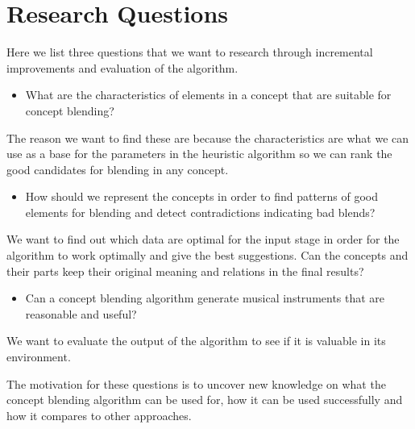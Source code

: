 
\section{Research Questions}
Here we list three questions that we want to research through incremental improvements and evaluation of the algorithm.
\begin{itemize}
\item What are the characteristics of elements in a concept that are suitable for concept blending?
\end{itemize}
The reason we want to find these are because the characteristics are what we can use as a base for the parameters in the heuristic algorithm so we can rank the good candidates for blending in any concept.
\begin{itemize}
\item How should we represent the concepts in order to find patterns of good elements for blending and detect contradictions indicating bad blends?
\end{itemize}
We want to find out which data are optimal for the input stage in order for the algorithm to work optimally and give the best suggestions. Can the concepts and their parts keep their original meaning and relations in the final results?
\begin{itemize}
\item Can a concept blending algorithm generate musical instruments that are reasonable and useful?
\end{itemize}
We want to evaluate the output of the algorithm to see if it is valuable in its environment.

The motivation for these questions is to uncover new knowledge on what the concept blending algorithm can be used for, how it can be used successfully and how it compares to other approaches.

